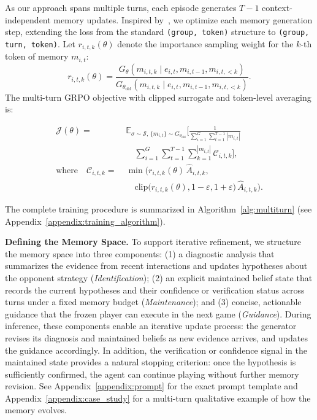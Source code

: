 \documentclass{article}
\theoremstyle{plain}
\theoremstyle{definition}
\theoremstyle{remark}
\begin{document}
As our approach spans multiple turns, each episode generates $T-1$ context-independent memory updates. Inspired by~\citet{yu2026memagent}, we optimize each memory generation step, extending the loss from the standard \texttt{(group, token)} structure to \texttt{(group, turn, token)}. Let $r_{i,t,k}(\theta)$ denote the importance sampling weight for the $k$-th token of memory $m_{i,t}$:
\begin{equation}
r_{i,t,k}(\theta) = \frac{G_\theta(m_{i,t,k} \mid e_{i,t}, m_{i,t-1}, m_{i,t,<k})}{G_{\theta_{\text{old}}}(m_{i,t,k} \mid e_{i,t}, m_{i,t-1}, m_{i,t,<k})}.
\label{eq:importance_weight}
\end{equation}
The multi-turn GRPO objective with clipped surrogate and token-level averaging is:

\begin{equation}
\begin{aligned}
\mathcal{J}(\theta) = \;& \mathbb{E}_{\sigma\sim\mathcal{S},\, \{m_{i,t}\}\sim G_{\theta_{\text{old}}}} \Bigg[ \frac{1}{\sum_{i=1}^{G}\sum_{t=1}^{T-1}|m_{i,t}|} \\
&\quad \sum_{i=1}^{G} \sum_{t=1}^{T-1} \sum_{k=1}^{|m_{i,t}|}  \mathcal{C}_{i,t,k} \Bigg], \\
\text{where}\quad \mathcal{C}_{i,t,k} = \;& \min\Big( r_{i,t,k}(\theta)\, \hat{A}_{i,t,k}, \\
&\quad \text{clip}\big(r_{i,t,k}(\theta), 1-\varepsilon, 1+\varepsilon\big)\, \hat{A}_{i,t,k} \Big).
\end{aligned}
\label{eq:grpo_loss}
\end{equation}

The complete training procedure is summarized in Algorithm~\ref{alg:multiturn} (see Appendix~\ref{appendix:training_algorithm}).

\textbf{Defining the Memory Space.}
To support iterative refinement, we structure the memory space into three components: (1) a diagnostic analysis that summarizes the evidence from recent interactions and updates hypotheses about the opponent strategy (\emph{Identification}); (2) an explicit maintained belief state that records the current hypotheses and their confidence or verification status across turns under a fixed memory budget (\emph{Maintenance}); and (3) concise, actionable guidance that the frozen player can execute in the next game (\emph{Guidance}). During inference, these components enable an iterative update process: the generator revises its diagnosis and maintained beliefs as new evidence arrives, and updates the guidance accordingly. In addition, the verification or confidence signal in the maintained state provides a natural stopping criterion: once the hypothesis is sufficiently confirmed, the agent can continue playing without further memory revision.
See Appendix~\ref{appendix:prompt} for the exact prompt template and Appendix~\ref{appendix:case_study} for a multi-turn qualitative example of how the memory evolves.
\end{document}

